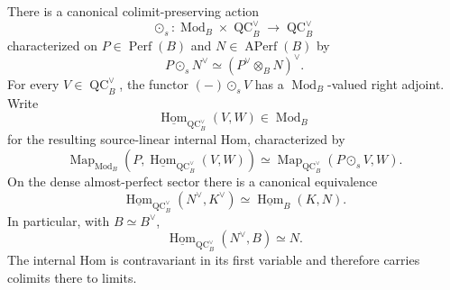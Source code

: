\begin{proposition}
\label{prop:as-source-linear-enrichment}
There is a canonical colimit-preserving action
\[
\boxed{
    \odot_s:
    \operatorname{Mod}_B
    \times
    \operatorname{QC}^{\vee}_B
    \longrightarrow
    \operatorname{QC}^{\vee}_B
}
\]
characterized on
$P\in\operatorname{Perf}(B)$ and
$N\in\operatorname{APerf}(B)$ by
\[
\boxed{
    P\odot_sN^\vee
    \simeq
    \left(P^\vee\otimes_BN\right)^\vee.
}
\]
For every $V\in\operatorname{QC}^{\vee}_B$, the functor
$(-)\odot_sV$ has a $\operatorname{Mod}_B$-valued right adjoint.  Write
\[
\boxed{
    \underline{\operatorname{Hom}}_{\operatorname{QC}^{\vee}_B}(V,W)
    \in
    \operatorname{Mod}_B
}
\]
for the resulting source-linear internal Hom, characterized by
\[
    \operatorname{Map}_{\operatorname{Mod}_B}
    \left(
        P,
        \underline{\operatorname{Hom}}_{\operatorname{QC}^{\vee}_B}(V,W)
    \right)
    \simeq
    \operatorname{Map}_{\operatorname{QC}^{\vee}_B}
    \left(P\odot_sV,W\right).
\]
On the dense almost-perfect sector there is a canonical equivalence
\[
\boxed{
    \underline{\operatorname{Hom}}_{\operatorname{QC}^{\vee}_B}
    \left(N^\vee,K^\vee\right)
    \simeq
    \underline{\operatorname{Hom}}_B(K,N).
}
\]
In particular, with $B\simeq B^\vee$,
\[
\boxed{
    \underline{\operatorname{Hom}}_{\operatorname{QC}^{\vee}_B}
    \left(N^\vee,B\right)
    \simeq N.
}
\]
The internal Hom is contravariant in its first variable and therefore carries
colimits there to limits.
\end{proposition}

